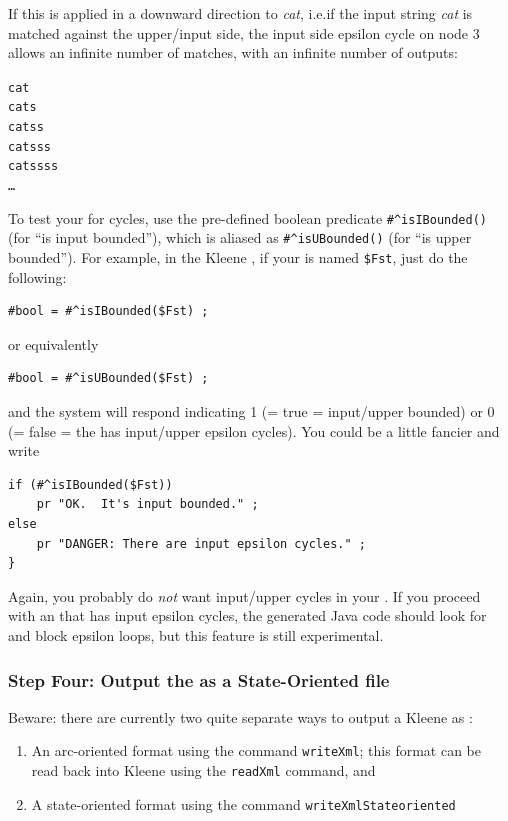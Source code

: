\noindent
If this \fsm{} is applied in a downward direction to \emph{cat}, i.e.\@ if the input string
\emph{cat} is matched against the upper/input side, the input side epsilon cycle on node 3
allows an infinite number of matches, with an infinite number of outputs:

\begin{alltt}
cat
cats
catss
catsss
catssss
\ldots{}
\end{alltt}

To test your \fsm{} for cycles, use the
pre-defined boolean predicate \verb!#^isIBounded()! (for ``is input bounded''), which is aliased as
\verb!#^isUBounded()! (for ``is upper bounded'').
For example, in the Kleene \gui{}, if your \fsm{} is named \verb!$Fst!, just do the
following:

\begin{Verbatim}
#bool = #^isIBounded($Fst) ;
\end{Verbatim}

\noindent
or equivalently

\begin{Verbatim}
#bool = #^isUBounded($Fst) ;
\end{Verbatim}

\noindent
and the system will respond indicating 1 (= true = input/upper bounded)
or 0 (= false = the \fsm{} has input/upper epsilon cycles).   
You could be a little fancier and write

\begin{Verbatim}
if (#^isIBounded($Fst))
    pr "OK.  It's input bounded." ;
else
    pr "DANGER: There are input epsilon cycles." ;
}
\end{Verbatim}

\noindent
Again, you
probably do \emph{not} want input/upper cycles in your \fsm{}.  If you proceed with an \fsm{}
that has input epsilon cycles, the generated Java code should look
for and block epsilon loops, but this feature is still experimental.

\subsubsection{Step Four: Output the \fsm{} as a State-Oriented \xml{} file}

Beware: there are currently two quite separate ways to output a Kleene \fsm{} as \xml{}:

\begin{enumerate}
\item
An arc-oriented format using the command \texttt{writeXml}; this
	\xml{} format can be read back into Kleene using the \texttt{readXml} command, and
\item
A state-oriented \xml{} format using the command \texttt{writeXmlStateoriented}
\end{enumerate}

